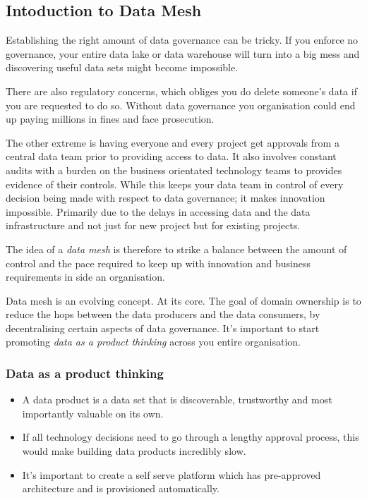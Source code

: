 
\subsection{Intoduction to Data Mesh}
Establishing the right amount of data governance can be tricky.
If you enforce no governance, your entire data lake or data warehouse will turn into a big mess and discovering useful data sets might become impossible.

\begin{note}
    There are also regulatory concerns, which obliges you do delete someone's data if you are requested to do so.
    Without data governance you organisation could end up paying millions in fines and face prosecution.
\end{note}
The other extreme is having everyone and every project get approvals from a central data team prior to providing access to data.
It also involves constant audits with a burden on the business orientated technology teams to provides evidence of their controls.
While this keeps your data team in control of every decision being made with respect to data governance; it makes innovation impossible.
Primarily due to the delays in accessing data and the data infrastructure and not just for new project but for existing projects.

The idea of a \textit{data mesh} is therefore to strike a balance between the amount of control and the pace required to keep up with innovation and business requirements in side an organisation.

Data mesh is an evolving concept.
At its core.
The goal of domain ownership is to reduce the hops between the data producers and the data consumers, by decentralising certain aspects of data governance.
It's important to start promoting \textit{data as a product thinking} across you entire organisation.

\subsubsection{Data as a product thinking}
\begin{itemize}
    \item A data product is a data set that is discoverable, trustworthy and most importantly valuable on its own.
    \item If all technology decisions need to go through a lengthy approval process, this would make building data products incredibly slow.
    \item It's important to create a self serve platform which has pre-approved architecture and is provisioned automatically.
\end{itemize}

